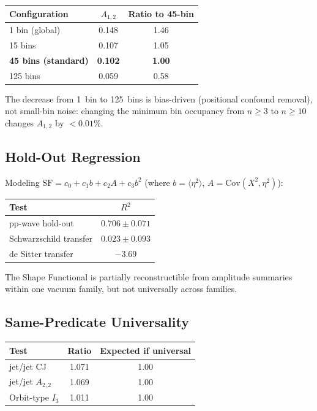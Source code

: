 \documentclass[12pt,a4paper]{article}
\begin{document}
\begin{center}
\begin{tabular}{lcc}
\toprule
Configuration & $A_{1,2}$ & Ratio to 45-bin \\
\midrule
1 bin (global) & 0.148 & 1.46 \\
15 bins & 0.107 & 1.05 \\
\textbf{45 bins (standard)} & \textbf{0.102} & \textbf{1.00} \\
125 bins & 0.059 & 0.58 \\
\bottomrule
\end{tabular}
\end{center}

\noindent The decrease from 1~bin to 125~bins is bias-driven (positional confound removal), not small-bin noise: changing the minimum bin occupancy from $n \geq 3$ to $n \geq 10$ changes $A_{1,2}$ by $< 0.01\%$.

\subsection{Hold-Out Regression}

Modeling $\mathrm{SF} = c_0 + c_1 b + c_2 A + c_3 b^2$ (where $b = \langle\eta^2\rangle$, $A = \mathrm{Cov}(X^2, \eta^2)$):

\begin{center}
\begin{tabular}{lc}
\toprule
Test & $R^2$ \\
\midrule
pp-wave hold-out & $0.706 \pm 0.071$ \\
Schwarzschild transfer & $0.023 \pm 0.093$ \\
de Sitter transfer & $-3.69$ \\
\bottomrule
\end{tabular}
\end{center}

\noindent The Shape Functional is partially reconstructible from amplitude summaries within one vacuum family, but not universally across families.

\subsection{Same-Predicate Universality}

\begin{center}
\begin{tabular}{lcc}
\toprule
Test & Ratio & Expected if universal \\
\midrule
jet/jet CJ & 1.071 & 1.00 \\
jet/jet $A_{2,2}$ & 1.069 & 1.00 \\
Orbit-type $I_3$ & 1.011 & 1.00 \\
\bottomrule
\end{tabular}
\end{center}
\end{document}
